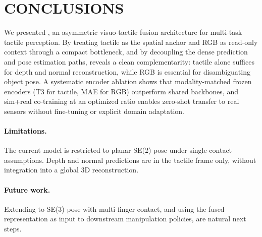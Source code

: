 \section{CONCLUSIONS}

We presented \method{}, an asymmetric visuo-tactile fusion architecture for
multi-task tactile perception. By treating tactile as the spatial anchor and
RGB as read-only context through a compact bottleneck, and by decoupling the
dense prediction and pose estimation paths, \method{} reveals a clean
complementarity: tactile alone suffices for depth and normal reconstruction,
while RGB is essential for disambiguating object pose. A systematic encoder
ablation shows that modality-matched frozen encoders (T3 for tactile, MAE for
RGB) outperform shared backbones, and sim+real co-training at an optimized
ratio enables zero-shot transfer to real sensors without fine-tuning or
explicit domain adaptation.

\paragraph{Limitations.}
The current model is restricted to planar SE(2) pose under single-contact
assumptions. Depth and normal predictions are in the tactile frame only,
without integration into a global 3D reconstruction.

\paragraph{Future work.}
Extending to SE(3) pose with multi-finger contact, and using the fused
representation as input to downstream manipulation policies, are natural next
steps.
